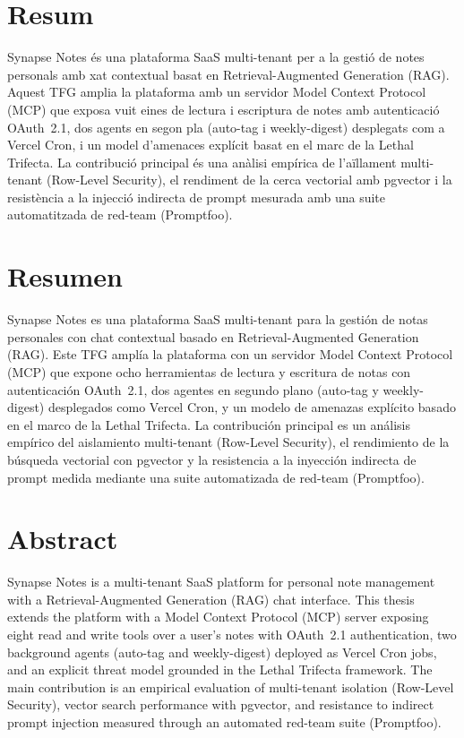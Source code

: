 \chapter*{Resum}

Synapse Notes és una plataforma SaaS multi-tenant per a la gestió de notes
personals amb xat contextual basat en Retrieval-Augmented Generation (RAG).
Aquest TFG amplia la plataforma amb un servidor Model Context Protocol
(MCP) que exposa vuit eines de lectura i escriptura de notes amb
autenticació OAuth~2.1, dos agents en segon pla (auto-tag i weekly-digest)
desplegats com a Vercel Cron, i un model d'amenaces explícit basat en el
marc de la Lethal Trifecta. La contribució principal és una anàlisi
empírica de l'aïllament multi-tenant (Row-Level Security), el rendiment
de la cerca vectorial amb pgvector i la resistència a la injecció
indirecta de prompt mesurada amb una suite automatitzada de red-team
(Promptfoo).

\chapter*{Resumen}

Synapse Notes es una plataforma SaaS multi-tenant para la gestión de
notas personales con chat contextual basado en Retrieval-Augmented
Generation (RAG). Este TFG amplía la plataforma con un servidor Model
Context Protocol (MCP) que expone ocho herramientas de lectura y
escritura de notas con autenticación OAuth~2.1, dos agentes en segundo
plano (auto-tag y weekly-digest) desplegados como Vercel Cron, y un
modelo de amenazas explícito basado en el marco de la Lethal Trifecta.
La contribución principal es un análisis empírico del aislamiento
multi-tenant (Row-Level Security), el rendimiento de la búsqueda
vectorial con pgvector y la resistencia a la inyección indirecta de
prompt medida mediante una suite automatizada de red-team (Promptfoo).

\chapter*{Abstract}

Synapse Notes is a multi-tenant SaaS platform for personal note
management with a Retrieval-Augmented Generation (RAG) chat interface.
This thesis extends the platform with a Model Context Protocol (MCP)
server exposing eight read and write tools over a user's notes with
OAuth~2.1 authentication, two background agents (auto-tag and
weekly-digest) deployed as Vercel Cron jobs, and an explicit threat
model grounded in the Lethal Trifecta framework. The main contribution
is an empirical evaluation of multi-tenant isolation (Row-Level
Security), vector search performance with pgvector, and resistance to
indirect prompt injection measured through an automated red-team suite
(Promptfoo).

